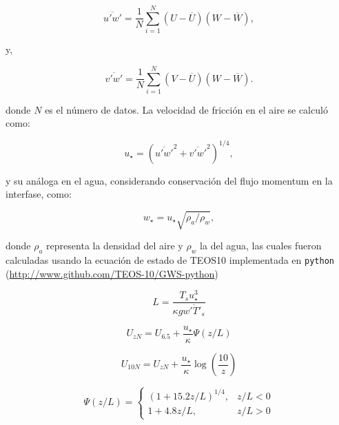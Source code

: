 \documentclass[11pt]{article}
\begin{document}
\begin{equation}
  \overline{u'w'} = \frac{1}{N} \sum_{i=1}^{N} (U-\overline{U})(W-\overline{W}),
\end{equation}

y,

\begin{equation}
  \overline{v'w'} = \frac{1}{N} \sum_{i=1}^{N} (V-\overline{U})(W-\overline{W}).
\end{equation}

donde $N$ es el número de datos. La velocidad de fricción en el aire se calculó
como:

\begin{equation}
  u_\star = \left( \overline{u'w'}^2 + \overline{v'w'}^2 \right)^{1/4},
\end{equation}

y su análoga en el agua, considerando conservación del flujo momentum en la
interfase, como:

\begin{equation}
  w_\star =  u_\star \sqrt{\rho_a / \rho_w},
\end{equation}

donde $\rho_a$ representa la densidad del aire y $\rho_w$ la del agua, las
cuales fueron calculadas usando la ecuación de estado de TEOS10 implementada en
\texttt{python} (\url{http://www.github.com/TEOS-10/GWS-python})


\begin{equation}
  L = \frac{T_s u_\star^3}{\kappa g \overline{w'T'_s}}
\end{equation}

\begin{equation}
  U_{zN} = U_{6.5} + \frac{u_\star}{\kappa}  \Psi (z/L)
\end{equation}

\begin{equation}
  U_{10N} = U_{zN} + \frac{u_\star}{\kappa} \log\left(\frac{10}{z}\right)
\end{equation}


\citet{Hogstrom1988}

\begin{equation}
  \Psi(z/L) = \left\{
    \begin{array}{cc}
      (1 + 15.2 z/L)^{1/4}, & z/L < 0 \\
      1 + 4.8 z/L,          & z/L > 0
    \end{array}  
  \right.
\end{equation}






\end{document}
